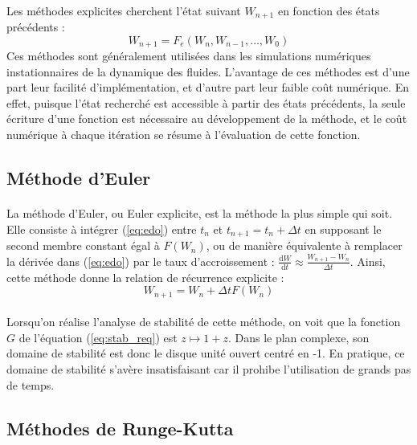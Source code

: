   \paragraph{}
  Les méthodes explicites cherchent l'état suivant $W_{n+1}$ en fonction des états précédents :
  \[W_{n+1} = F_e\left(W_n, W_{n-1}, \dots, W_0\right)\]
  Ces méthodes sont généralement utilisées dans les simulations numériques instationnaires de la dynamique des fluides.
  L'avantage de ces méthodes est d'une part leur facilité d'implémentation, et d'autre part leur faible coût numérique.
  En effet, puisque l'état recherché est accessible à partir des états précédents, la seule écriture d'une fonction est nécessaire au développement de la méthode, et le coût numérique à chaque itération se résume à l'évaluation de cette fonction.

  \subsection{Méthode d'Euler}

    \paragraph{}
    La méthode d'Euler, ou Euler explicite, est la méthode la plus simple qui soit.
    Elle consiste à intégrer (\ref{eq:edo}) entre $t_n$ et $t_{n+1} = t_n + \Delta t$ en supposant le second membre constant égal à $F\left(W_n\right)$, ou de manière équivalente à remplacer la dérivée dans (\ref{eq:edo}) par le taux d'accroissement : $\frac{\mathrm{d}W}{\mathrm{d}t}\approx\frac{W_{n+1}-W_n}{\Delta t}$.
    Ainsi, cette méthode donne la relation de récurrence explicite :
    \[W_{n+1} = W_n + \Delta t F\left(W_n\right)\]

    \paragraph{}
    Lorsqu'on réalise l'analyse de stabilité de cette méthode, on voit que la fonction $G$ de l'équation (\ref{eq:stab_req}) est $z\mapsto 1 + z$.
    Dans le plan complexe, son domaine de stabilité est donc le disque unité ouvert centré en -1.
    En pratique, ce domaine de stabilité s'avère insatisfaisant car il prohibe l'utilisation de grands pas de temps.


  \subsection{Méthodes de Runge-Kutta}

